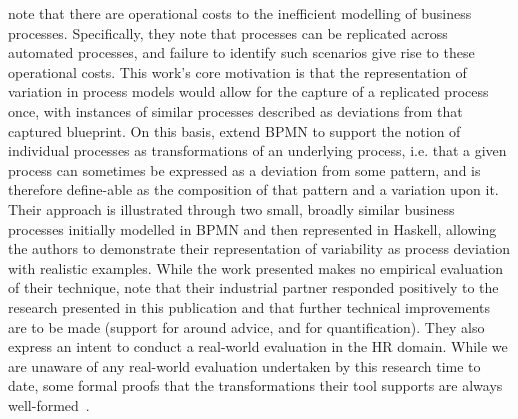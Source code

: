 

\citeauthor{Machado_2011} note that there are operational costs to the
inefficient modelling of business processes. Specifically, they note that
processes can be replicated across automated processes, and failure to identify
such scenarios give rise to these operational costs. This work's core motivation
is that the representation of variation in process models would allow for the
capture of a replicated process once, with instances of similar processes
described as deviations from that captured blueprint. On this basis,
\citeauthor{Machado_2011} extend BPMN to support the notion of individual
processes as transformations of an underlying process, i.e. that a given process
can sometimes be expressed as a deviation from some pattern, and is therefore
define-able as the composition of that pattern and a variation upon it. Their
approach is illustrated through two small, broadly similar business processes
initially modelled in BPMN and then represented in Haskell, allowing the authors
to demonstrate their representation of variability as process deviation with
realistic examples. While the work presented makes no empirical evaluation of
their technique, \citeauthor{Machado_2011} note that their industrial partner
responded positively to the research presented in this publication and that
further technical improvements are to be made (support for around advice, and
for quantification). They also express an intent to conduct a real-world
evaluation in the HR domain. While we are unaware of any real-world evaluation
undertaken by this research time to date, some formal proofs that the
transformations their tool supports are always well-formed~\cite{machado2012formal}.

